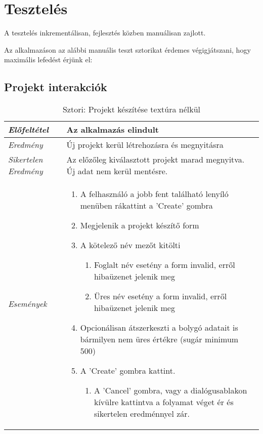 \chapter{Tesztelés}
\label{ch:intro}

A tesztelés inkrementálisan, fejlesztés közben manuálisan zajlott.

Az alkalmazáson az alábbi manuális teszt sztorikat érdemes végigjátszani, hogy maximális lefedést érjünk el:

\section{Projekt interakciók}

\begin{table}[H]
	\centering
	\begin{tabular}{ | m{} | m{} | }
		\hline
		\emph{Előfeltétel} & Az alkalmazás elindult  \\
		\hline
		\emph{Eredmény} & Új projekt kerül létrehozásra és megnyitásra  \\
		\hline
		\emph{Sikertelen Eredmény} & Az előzőleg kiválasztott projekt marad megnyitva. Új adat nem kerül mentésre.  \\
		\hline
		\hline
		\emph{Események} &

		\begin{enumerate}
			\item A felhasználó a jobb fent található lenyíló menüben rákattint a 'Create' gombra
			\item Megjelenik a projekt készítő form
			\item A kötelező név mezőt kitölti
			\begin{enumerate}
				\item Foglalt név esetény a form invalid, erről hibaüzenet jelenik meg
				\item Üres név esetény a form invalid, erről hibaüzenet jelenik meg
			\end{enumerate}
			\item Opcionálisan átszerkeszti a bolygó adatait is bármilyen nem üres értékre (sugár minimum 500)
			\item A 'Create' gombra kattint.
			\begin{enumerate}
				\item A 'Cancel' gombra, vagy a dialógusablakon kívülre kattintva a folyamat véget ér és sikertelen eredménnyel zár.
			\end{enumerate}
		\end{enumerate}

		\\
		\hline
	\end{tabular}
	\caption{Sztori: Projekt készítése textúra nélkül}
	\label{tab:story-project-create}
\end{table}

